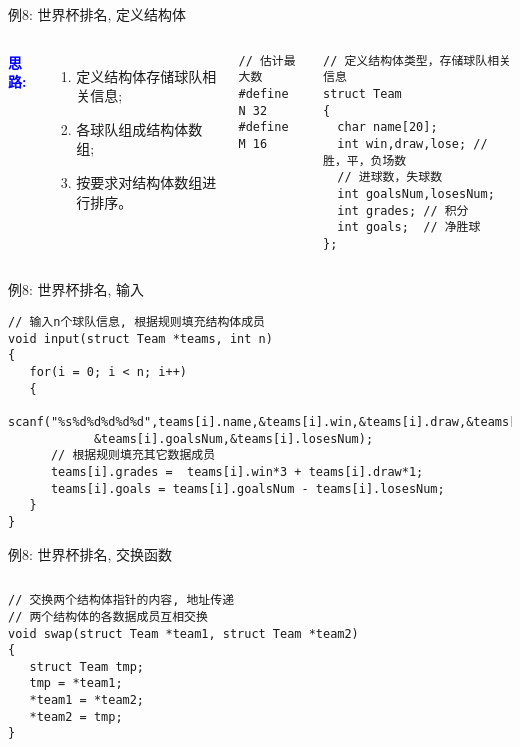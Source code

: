 \begin{frame}{例8: 世界杯排名, 定义结构体}
\begin{columns}[T]
\textbf{\textcolor{blue}{思路:}}
\begin{enumerate}
	\item 定义结构体存储球队相关信息;
	\item 各球队组成结构体数组;
	\item 按要求对结构体数组进行排序。
\end{enumerate}
\begin{lstlisting}
// 估计最大数 
#define N 32
#define M 16
\end{lstlisting}
\begin{lstlisting}
// 定义结构体类型，存储球队相关信息 
struct Team
{
  char name[20];
  int win,draw,lose; // 胜，平，负场数 
  // 进球数，失球数
  int goalsNum,losesNum; 
  int grades; // 积分
  int goals;  // 净胜球  
};
\end{lstlisting}
\end{columns}
\end{frame}

\begin{frame}{例8: 世界杯排名, 输入}
\begin{lstlisting}
// 输入n个球队信息, 根据规则填充结构体成员
void input(struct Team *teams, int n)
{
   for(i = 0; i < n; i++)
   {
      scanf("%s%d%d%d%d%d",teams[i].name,&teams[i].win,&teams[i].draw,&teams[i].lose,
      		&teams[i].goalsNum,&teams[i].losesNum);
      // 根据规则填充其它数据成员
      teams[i].grades =  teams[i].win*3 + teams[i].draw*1;
      teams[i].goals = teams[i].goalsNum - teams[i].losesNum; 
   }
}
\end{lstlisting}
\end{frame}

\begin{frame}{例8: 世界杯排名, 交换函数}
\begin{columns}[T]
\begin{lstlisting}
// 交换两个结构体指针的内容, 地址传递
// 两个结构体的各数据成员互相交换 
void swap(struct Team *team1, struct Team *team2)
{
   struct Team tmp;
   tmp = *team1; 
   *team1 = *team2; 
   *team2 = tmp;
}
\end{lstlisting}
\end{columns}
\medskip
\end{frame}

